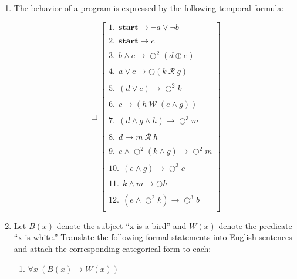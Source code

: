 \documentclass[12pt]{article}
\begin{document}
\begin{enumerate}
\item The behavior of a program is expressed by the following temporal formula:

\[
\Box	\begin{bmatrix}
	
	1.~~   \textbf{start} \rightarrow \neg a \vee \neg b  \\
	\ \\
	2.~~   \textbf{start} \rightarrow c\\
	\ \\    
	3.~~   b \wedge c \rightarrow \bigcirc^{2} (d \oplus e)\\
	\ \\    
	4.~~   a \vee c \rightarrow \bigcirc (k~\mathcal{R}~g)\\
	\ \\    
	5.~~   (d \vee e) \rightarrow \bigcirc^{2} k\\
	\ \\    
	6.~~   c \rightarrow (h ~\mathcal{W}~ (e \wedge g))\\
	\ \\    
	7.~~   (d \wedge g \wedge h) \rightarrow \bigcirc^{3} m\\
	\ \\
	8.~~   d \rightarrow m~\mathcal{R}~h \\
	\ \\
	9.~~   e \wedge \bigcirc^{2} (k \wedge g) \rightarrow \bigcirc^{2}m \\
	\ \\
	10.~~  (e \wedge g) \rightarrow \bigcirc^{3} c\\
	\ \\
	11.~~  k \wedge m \rightarrow \bigcirc h\\
	\ \\
	12.~~  (e \wedge \bigcirc^{2}k) \rightarrow \bigcirc^{3}b \\
	
\end{bmatrix}
\]





\item Let $B(x)$ denote the subject ``x is a bird'' and $W(x)$ denote the predicate ``x is white.'' Translate the following formal statements into English sentences and attach the corresponding categorical form to each:

\begin{enumerate}
\item $\forall x~(B(x) \rightarrow W(x))$



\end{enumerate}
\end{enumerate}
\end{document}
